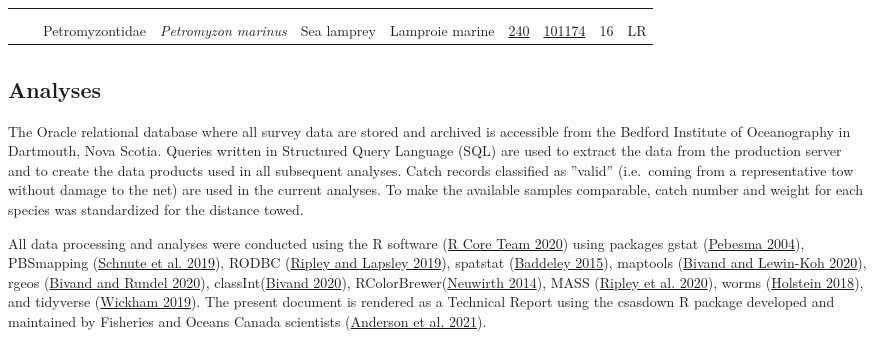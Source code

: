 \documentclass[12pt]{article}\usepackage[]{graphicx}\usepackage[]{color}
\begin{document}
\begin{landscapepage}
\begin{longtable}[t]{ccc>{\centering\arraybackslash}p{3cm}>{\centering\arraybackslash}p{3cm}>{\centering\arraybackslash}p{3cm}>{}c>{}ccc}
\addlinespace[0.3em]
\\
\addlinespace[0.3em]
\\
\hspace{1em}\hspace{1em} &  & Petromyzontidae & \em{Petromyzon marinus} & Sea lamprey & Lamproie marine & \href{#sec:240}{240} & \href{http://www.marinespecies.org/aphia.php?p=taxdetails&id=101174}{101174} & 16 & LR\\*
\end{longtable}
\endgroup{}
\end{landscapepage}
\hypertarget{analyses}{%
\subsection{Analyses}\label{analyses}}

The Oracle relational database where all survey data are stored and archived is accessible from the Bedford Institute of Oceanography in Dartmouth, Nova Scotia. Queries written in Structured Query Language (SQL) are used to extract the data from the production server and to create the data products used in all subsequent analyses. Catch records classified as ''valid'' (i.e.~coming from a representative tow without damage to the net) are used in the current analyses. To make the available samples comparable, catch number and weight for each species was standardized for the distance towed.

All data processing and analyses were conducted using the R software (\protect\hyperlink{ref-R:2020}{R Core Team 2020}) using packages gstat (\protect\hyperlink{ref-R:package:gstat}{Pebesma 2004}), PBSmapping (\protect\hyperlink{ref-R:package:PBSmapping}{Schnute et al. 2019}), RODBC (\protect\hyperlink{ref-R:package:RODBC}{Ripley and Lapsley 2019}), spatstat (\protect\hyperlink{ref-R:package:spatstat}{Baddeley 2015}), maptools (\protect\hyperlink{ref-R:package:maptools}{Bivand and Lewin-Koh 2020}), rgeos (\protect\hyperlink{ref-R:package:rgeos}{Bivand and Rundel 2020}), classInt(\protect\hyperlink{ref-R:package:classInt}{Bivand 2020}), RColorBrewer(\protect\hyperlink{ref-R:package:RColorBrewer}{Neuwirth 2014}), MASS (\protect\hyperlink{ref-R:package:MASS}{Ripley et al. 2020}), worms (\protect\hyperlink{ref-R:package:worms}{Holstein 2018}), and tidyverse (\protect\hyperlink{ref-R:Tidyverse}{Wickham 2019}). The present document is rendered as a Technical Report using the csasdown R package developed and maintained by Fisheries and Oceans Canada scientists (\protect\hyperlink{ref-R:csasdown}{Anderson et al. 2021}).
\end{document}
